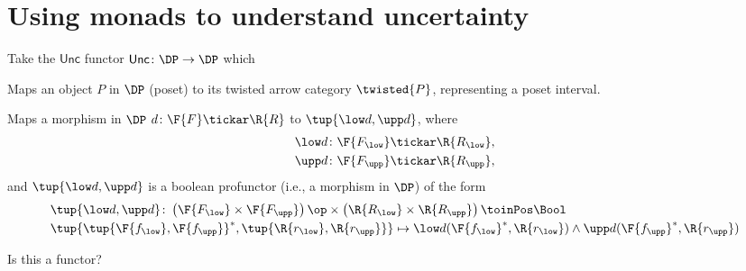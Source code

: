 \section{Using monads to understand uncertainty}

Take the $\mathsf{Unc}$ functor $\mathsf{Unc}\colon \DP\to \DP$ which 
\begin{compactenum}
    \item Maps an object $P$ in $\DP$ (poset) to its twisted arrow category $\twisted{P}$, representing a poset interval.
    \item Maps a morphism in $\DP$ $d\colon \F{F}\tickar \R{R}$ to $\tup{\low d,\upp d}$, where
    \begin{equation}
    \begin{aligned}
        \low d\colon \F{F_{\low}}&\tickar \R{R_{\low}},\\
        \upp d\colon \F{F_{\upp}}&\tickar \R{R_{\upp}},
    \end{aligned}
    \end{equation}
    and $\tup{\low d,\upp d}$ is a boolean profunctor (i.e., a morphism in $\DP$) of the form
    \begin{equation}
    \begin{aligned}
        &\tup{\low d,\upp d}\colon \left(\F{F_{\low}}\times \F{F_{\upp}} \right)\op \times \left(\R{R_{\low}}\times \R{R_{\upp}} \right)\toinPos \Bool\\
        &\tup{\tup{\F{f_{\low}},\F{f_{\upp}}}^*,\tup{\R{r_{\low}},\R{r_{\upp}}}}\mapsto \low d(\F{f_{\low}}^*,\R{r_{\low}})\wedge \upp d(\F{f_{\upp}}^*,\R{r_{\upp}})
    \end{aligned}
    \end{equation}
\end{compactenum}

Is this a functor?

